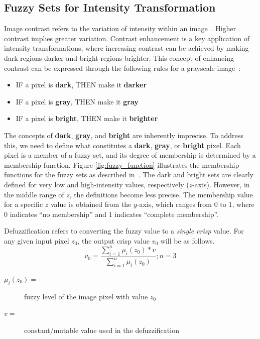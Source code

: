 \subsection*{Fuzzy Sets for Intensity Transformation}
Image contrast refers to the variation of intensity within an image~\cite{guojin2007study,pratt2007digital,gonzalez2008digital}. 
Higher contrast implies greater variation. 
Contrast enhancement is a key application of intensity transformations, where increasing contrast can be achieved by making dark regions darker and bright regions brighter. This concept of enhancing contrast can be expressed through the following rules for a grayscale image~\cite{gonzalez2008digital}:
\begin{itemize}
    \item IF a pixel is \textbf{dark}, THEN make it \textbf{darker}
    \item IF a pixel is \textbf{gray}, THEN make it \textbf{gray}
    \item IF a pixel is \textbf{bright}, THEN make it \textbf{brighter}
\end{itemize}

The concepts of \textbf{dark}, \textbf{gray}, and \textbf{bright} are inherently imprecise. To address this, we need to define what constitutes a \textbf{dark}, \textbf{gray}, or \textbf{bright} pixel. Each pixel is a member of a fuzzy set, and its degree of membership is determined by a membership function. Figure \ref{fig:fuzzy_function} 
illustrates the membership functions for the fuzzy sets as described in~\cite{gonzalez2008digital}. The dark and bright sets are clearly defined for very low and high-intensity values, respectively ($z$-axis). However, in the middle range of $z$, the definitions become less precise. The membership value for a specific $z$ value is obtained from the $y$-axis, which ranges from $0$ to $1$, where $0$ indicates ``no membership'' and $1$ indicates ``complete membership''. 

Defuzzification refers to converting the fuzzy value to a {\em single crisp} value. For any given input pixel $z_0$, the output crisp value $v_0$ will be as follows.
\begin{equation} \label{eqn:defuzzy}
v_0 = \frac{\sum\limits_{i=1}^n\mu_{i}(z_0) * v}{\sum\limits_{i=1}^n\mu_{i}(z_0)};n=3
\end{equation}
\begin{description}
    \item[$\mu_{i}(z_0) = $] \quad fuzzy level of the image pixel with value $z_0$
    \item[$v =$] constant/mutable value used in the defuzzification 
\end{description}
